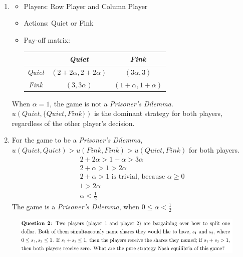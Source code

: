 \documentclass[12pt]{article}
\newenvironment{solution}[2][Solution]{\begin{trivlist}
\item[\hskip \labelsep {\bfseries #1}]}{\end{trivlist}}
\begin{document}
\begin{solution}{}~
\begin{enumerate}[label=\alph*)]
\item \begin{itemize}
\item Players: Row Player and Column Player
\item Actions: Quiet or Fink
\item Pay-off matrix:\\
\begin{tabular}{| c || c | c |}\hline
 & \textit{Quiet} & \textit{Fink} \\
 \hline\hline
 \textit{Quiet} & $(2+2\alpha,2+2\alpha)$ & $(3\alpha,3)$\\
 \textit{Fink} & $(3,3\alpha)$ & $(1+\alpha,1+\alpha)$\\
 \hline
\end{tabular}
\end{itemize}

When $\alpha=1$, the game is not a \textit{Prisoner's Dilemma}.\\
$u(\textit{Quiet},\{\textit{Quiet},\textit{Fink}\})$ is the dominant strategy for both players, regardless of the other player's decision.
\item For the game to be a \textit{Prisoner's Dilemma},\\
$u(\textit{Quiet},\textit{Quiet})>u(\textit{Fink},\textit{Fink})>u(\textit{Quiet},\textit{Fink})$ for both players.
\begin{gather*}
2+2\alpha>1+\alpha>3\alpha\\
2+\alpha>1>2\alpha\\
2+\alpha>1\text{ is trivial, because }\alpha\geq0\\
1>2\alpha\\
\alpha<\frac{1}{2}
\end{gather*}
The game is a \textit{Prisoner's Dilemma}, when $0\leq\alpha<\frac{1}{2}$
\end{enumerate}
\end{solution}

\begin{figure}[h!]
\includegraphics[width=\linewidth]{./assets/201805201646.png}
\end{figure}
\end{document}
